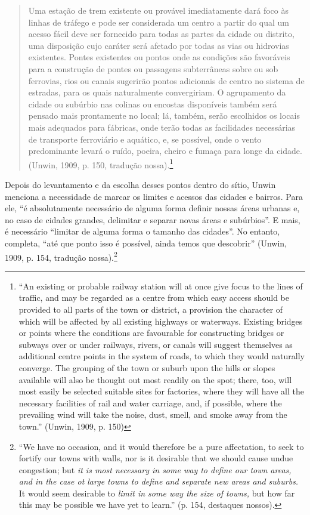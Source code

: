\documentclass[12pt, a4paper]{book} %
\begin{document}
        \begin{quotation}
            Uma estação de trem existente ou provável imediatamente dará foco às linhas de tráfego e pode ser considerada um centro a partir do qual um acesso fácil deve ser fornecido para todas as partes da cidade ou distrito, uma disposição cujo caráter será afetado por todas as vias ou hidrovias existentes. Pontes existentes ou pontos onde as condições são favoráveis para a construção de pontes ou passagens subterrâneas sobre ou sob ferrovias, rios ou canais sugerirão pontos adicionais de centro no sistema de estradas, para os quais naturalmente convergiriam. O agrupamento da cidade ou subúrbio nas colinas ou encostas disponíveis também será pensado mais prontamente no local; lá, também, serão escolhidos os locais mais adequados para fábricas, onde terão todas as facilidades necessárias de transporte ferroviário e aquático, e, se possível, onde o vento predominante levará o ruído, poeira, cheiro e fumaça para longe da cidade. (Unwin, 1909, p. 150, tradução nossa).\footnote[41]{``An existing or probable railway station will at once give focus to the lines of traffic, and may be regarded as a centre from which easy access should be provided to all parts of the town or district, a provision the character of which will be affected by all existing highways or waterways. Existing bridges or points where the conditions are favourable for constructing bridges or subways over or under railways, rivers, or canals will suggest themselves as additional centre points in the system of roads, to which they would naturally converge. The grouping of the town or suburb upon the hills or slopes available will also be thought out most readily on the spot; there, too, will most easily be selected suitable sites for factories, where they will have all the necessary facilities of rail and water carriage, and, if possible, where the prevailing wind will take the noise, dust, smell, and smoke away from the town.'' (Unwin, 1909, p. 150)}
        \end{quotation}

        Depois do levantamento e da escolha desses pontos dentro do sítio, Unwin menciona a necessidade de marcar os limites e acessos das cidades e bairros. Para ele, ``é absolutamente necessário de alguma forma definir nossas áreas urbanas e, no caso de cidades grandes, delimitar e separar novas áreas e subúrbios''. E mais, é necessário ``limitar de alguma forma o tamanho das cidades''. No entanto, completa, ``até que ponto isso é possível, ainda temos que descobrir'' (Unwin, 1909, p. 154, tradução nossa).\footnote[42]{``We have no occasion, and it would therefore be a pure affectation, to seek to fortify our towns with walls, nor is it desirable that we should cause undue congestion; but \textit{it is most necessary in some way to define our town areas, and in the case ot large towns to define and separate new areas and suburbs.} It would seem desirable to \textit{limit in some way the size of towns,} but how far this may be possible we have yet to learn.'' (p. 154, destaques nossos).} 
\end{document}
